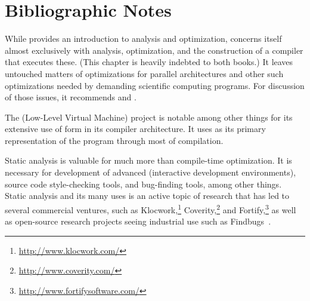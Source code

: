 
\section{Bibliographic Notes}
While \citet[chapters~8--10]{Cooper:Engineering:2004} provides an introduction to analysis and optimization, \citet{Muchnick:Advanced:1997} concerns itself almost exclusively with analysis, optimization, and the construction of a compiler that executes these. (This chapter is heavily indebted to both books.) It leaves untouched matters of optimizations for parallel architectures and other such optimizations needed by demanding scientific computing programs. For discussion of those issues, it recommends \citet{Bannerjee:Dependence:1988,Bannerjee:Loop:1993,Bannerjee:Loop:1994,Wolfe:High-Performance:1996} and \citet{Zima:Supercompilers:1991}.

The  (Low-Level Virtual Machine) project \citep{Lattner:LLVM:2002} is notable among other things for its extensive use of \SSA form in its compiler architecture. It uses \SSA as its primary representation of the program through most of compilation.

Static analysis is valuable for much more than compile-time optimization. It is necessary for development of advanced  (interactive development environments), source code style-checking tools, and bug-finding tools, among other things. Static analysis and its many uses is an active topic of research that has led to several commercial ventures, such as Klocwork,\footnote{\url{http://www.klocwork.com/}} Coverity,\footnote{\url{http://www.coverity.com/}} and Fortify,\footnote{\url{http://www.fortifysoftware.com/}} as well as open-source research projects seeing industrial use such as Findbugs~\citep{Hovemeyer:Finding:2004}.